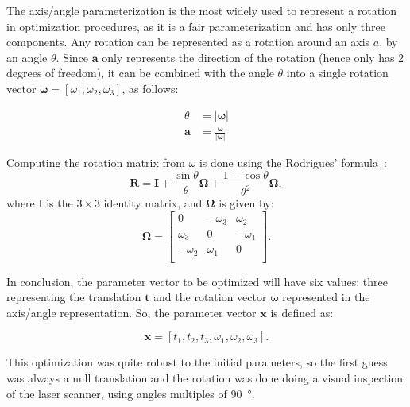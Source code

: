 \documentclass[conference]{IEEEtran}
\begin{document}
The axis/angle parameterization is the most widely used to represent a rotation in optimization procedures, as it is a fair parameterization and has only three components. Any rotation can be represented as a rotation around an axis $a$, by an angle $\theta$. Since $\bm{a}$ only represents the direction of the rotation (hence only has 2 degrees of freedom), it can be combined with the angle $\theta$ into a single rotation vector $\bm{\omega} = \left[\omega_1, \omega_2, \omega_3\right]$, as follows:

\begin{equation}
    \label{eqn:axis-angle}
    \begin{aligned}
        \theta & = |\bm{\omega}| \\
        \bm{a} & = \frac{\bm{\omega}}{|\bm{\omega}|}
    \end{aligned}
\end{equation}

Computing the rotation matrix from $\omega$ is done using the Rodrigues' formula~\cite{schmidt01}:
%
\begin{equation}
    \textbf{R} = \bm{I} + \frac{\sin \theta}{\theta} \bm{\Omega} + \frac{1 - \cos \theta}{\theta^2} \bm{\Omega},
\end{equation}
%
\noindent
where I is the $3\times3$ identity matrix, and $\bm{\Omega}$ is given by:
%
\begin{equation}
    \bm{\Omega} = \left[
        \begin{array}{ccc}
            0  & -\omega_3 & \omega_2 \\
            \omega_3 & 0   & -\omega_1 \\
            -\omega_2 & \omega_1 & 0 \\
        \end{array}
    \right].
\end{equation}


In conclusion, the parameter vector to be optimized will have six values: three representing the translation $\bm{t}$ and the rotation vector $\bm{\omega}$ represented in the axis/angle representation. So, the parameter vector $\bm{x}$ is defined as:

\begin{equation}
    \bm{x} = \left[t_1, t_2, t_3, \omega_1, \omega_2, \omega_3\right].
\end{equation}

This optimization was quite robust to the initial parameters, so the first guess was always a null translation and the rotation was done doing a visual inspection of the laser scanner, using angles multiples of \SI{90}{\degree}.
\end{document}
